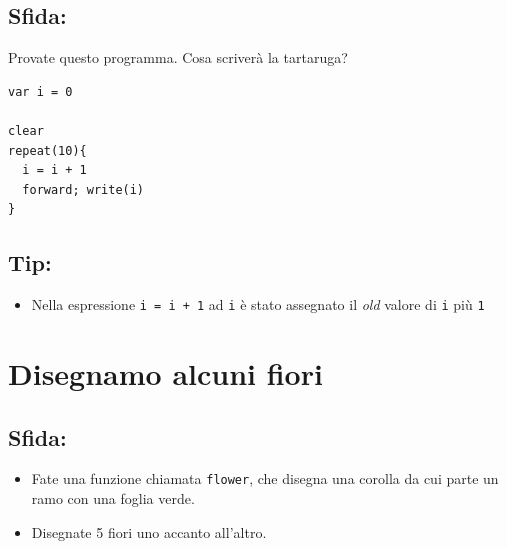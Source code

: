 \section*{\color{BrickRed}Sfida:}
Provate questo programma. Cosa scriverà la tartaruga?

\begin{lstlisting}[basicstyle={\ttfamily\fontsize{16}{19}\selectfont},numbers=none]
var i = 0

clear
repeat(10){
  i = i + 1
  forward; write(i)
}
\end{lstlisting}
        
\section*{\color{OliveGreen}Tip:}


\begin{itemize}

\item {Nella espressione \lstinline{i = i + 1} ad \lstinline{i} è stato assegnato il {\it old} valore di \lstinline{i} più \lstinline{1}}

\end{itemize}


\chapter{Disegnamo alcuni fiori}\section*{\color{BrickRed}Sfida:}


\begin{itemize}

\item {Fate una funzione chiamata \lstinline{flower}, che disegna una corolla da cui parte un ramo con una foglia verde.}
\item {Disegnate 5 fiori uno accanto all'altro.}

\end{itemize}



  
